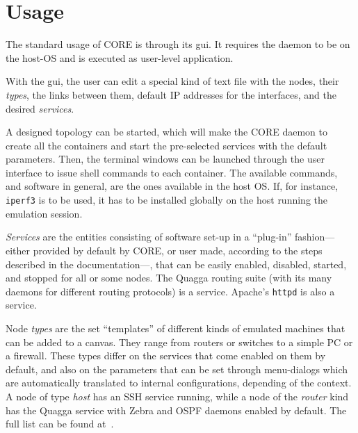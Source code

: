 \section{Usage}
\label{sec:coreusage}

The standard usage of CORE is through its \gls{gui}.
It requires the daemon to be on the host-OS and is executed as user-level application.

With the \gls{gui}, the user can edit a special kind of text file with the nodes, their \emph{types}, the links between them, default IP addresses for the interfaces, and the desired \emph{services}.

A designed topology can be started, which will make the CORE daemon to create all the containers and start the pre-selected services with the default parameters.
Then, the terminal windows can be launched through the user interface to issue shell commands to each container.
The available commands, and software in general, are the ones available in the host OS.
If, for instance, \texttt{iperf3} is to be used, it has to be installed globally on the host running the emulation session.

\emph{Services} are the entities consisting of software set-up in a ``plug-in'' fashion---either provided by default by CORE, or user made, according to the steps described in the documentation---, that can be easily enabled, disabled, started, and stopped for all or some nodes.
The Quagga routing suite (with its many daemons for different routing protocols) is a service. Apache's \texttt{httpd} is also a service.

Node \emph{types} are the set ``templates'' of different kinds of emulated machines that can be added to a canvas. They range from routers or switches to a simple PC or a firewall.
These types differ on the services that come enabled on them by default, and also on the parameters that can be set through menu-dialogs which are automatically translated to internal configurations, depending of the context.
A node of type \emph{host} has an SSH service running, while a node of the \emph{router} kind has the Quagga service with Zebra and OSPF daemons enabled by default.
The full list can be found at~\cite{coredocs}.

